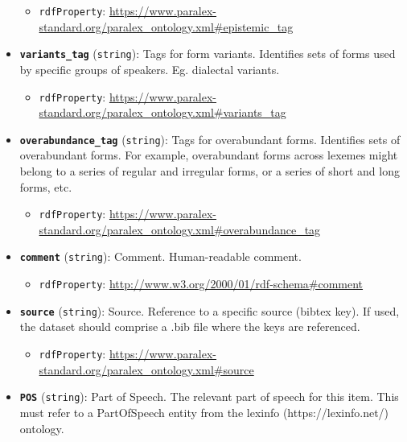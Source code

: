 \begin{itemize}
  \begin{itemize}
  \tightlist
  \item
    \texttt{rdfProperty}:
    \url{https://www.paralex-standard.org/paralex_ontology.xml\#epistemic_tag}
  \end{itemize}
\item
  \textbf{\texttt{variants\_tag}} (\texttt{string}): Tags for form
  variants. Identifies sets of forms used by specific groups of
  speakers. Eg. dialectal variants.

  \begin{itemize}
  \tightlist
  \item
    \texttt{rdfProperty}:
    \url{https://www.paralex-standard.org/paralex_ontology.xml\#variants_tag}
  \end{itemize}
\item
  \textbf{\texttt{overabundance\_tag}} (\texttt{string}): Tags for
  overabundant forms. Identifies sets of overabundant forms. For
  example, overabundant forms across lexemes might belong to a series of
  regular and irregular forms, or a series of short and long forms, etc.

  \begin{itemize}
  \tightlist
  \item
    \texttt{rdfProperty}:
    \url{https://www.paralex-standard.org/paralex_ontology.xml\#overabundance_tag}
  \end{itemize}
\item
  \textbf{\texttt{comment}} (\texttt{string}): Comment. Human-readable
  comment.

  \begin{itemize}
  \tightlist
  \item
    \texttt{rdfProperty}:
    \url{http://www.w3.org/2000/01/rdf-schema\#comment}
  \end{itemize}
\item
  \textbf{\texttt{source}} (\texttt{string}): Source. Reference to a
  specific source (bibtex key). If used, the dataset should comprise a
  .bib file where the keys are referenced.

  \begin{itemize}
  \tightlist
  \item
    \texttt{rdfProperty}:
    \url{https://www.paralex-standard.org/paralex_ontology.xml\#source}
  \end{itemize}
\item
  \textbf{\texttt{POS}} (\texttt{string}): Part of Speech. The relevant
  part of speech for this item. This must refer to a PartOfSpeech entity
  from the lexinfo (https://lexinfo.net/) ontology.


\end{itemize}
